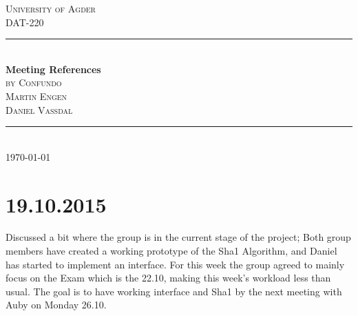 \documentclass[12pt]{article}
\begin{document}
\begin{titlepage}

\newcommand{\HRule}{\rule{\linewidth}{0.5mm}} %
\center %
 
 
\textsc{\LARGE University of Agder}\\[1.5cm]
\textsc{\Large DAT-220}\\[0.5cm]

\vspace{25 mm}
\HRule \\[0.6cm]
{ \huge \bfseries Meeting References}\\[0.4cm]
\textsc{\Large by Confundo}\\[0.5cm]
\textsc{Martin Engen}\\
\textsc{Daniel Vassdal}
\HRule \\[1.5cm]
 
 
 
\vspace{100 mm}
{\large \today}\\[3cm]
\vfill
\end{titlepage}



\pagestyle{fancy}
\setcounter{secnumdepth}{5}

\newpage

\section*{19.10.2015}
Discussed a bit where the group is in the current stage of the project; Both group members have created a working prototype of the Sha1 Algorithm, and Daniel has started to implement an interface. For this week the group agreed to mainly focus on the Exam which is the 22.10, making this week’s workload less than usual. The goal is to have working interface and Sha1 by the next meeting with Auby on Monday 26.10.
\end{document}
